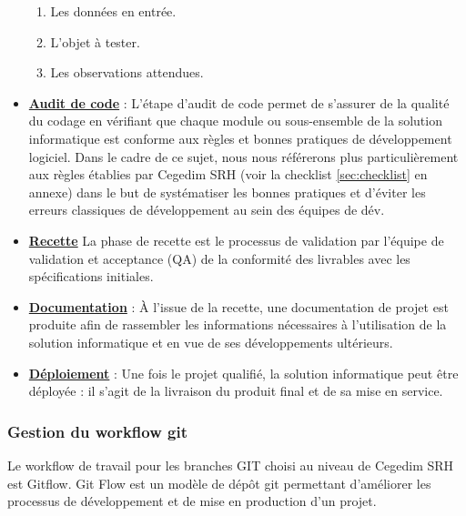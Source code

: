 \begin{itemize}
    \begin{enumerate}
        \item Les données en entrée. 
        \item L'objet à tester. 
        \item Les observations attendues.
    \end{enumerate}
    \item \textbf{\underline{Audit de code}} : L'étape d'audit de code permet de s'assurer de la qualité du codage en vérifiant que chaque module ou sous-ensemble de la solution informatique est conforme aux règles et bonnes pratiques de développement logiciel. Dans le cadre de ce sujet, nous nous référerons plus particulièrement aux règles établies par Cegedim SRH (voir la checklist \ref{sec:checklist} en annexe) dans le but de systématiser les bonnes pratiques et d'éviter les erreurs classiques de développement au sein des équipes de dév.
    \item \textbf{\underline{Recette}} La phase de recette est le processus de validation par l'équipe de validation et acceptance (QA) de la conformité des livrables avec les spécifications initiales.
    \item \textbf{\underline{Documentation}} : À l’issue de la recette, une documentation de projet est produite afin de rassembler les informations nécessaires à l’utilisation de la solution informatique et en vue de ses développements ultérieurs.
    \item \textbf{\underline{Déploiement}} : Une fois le projet qualifié, la solution informatique peut être déployée : il s’agit de la livraison du produit final et de sa mise en service.
\end{itemize}
\subsubsection{Gestion du workflow git}
Le workflow de travail pour les branches GIT choisi au niveau de Cegedim SRH est Gitflow. Git Flow est un modèle de dépôt git permettant d'améliorer les processus de développement et de mise en production d'un projet.\\

